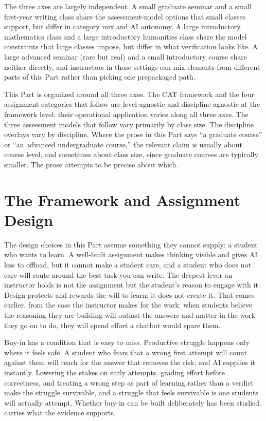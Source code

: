 \documentclass{SIAMbook2023}
\begin{document}
The three axes are largely independent. A small graduate seminar and a small first-year writing class share the assessment-model options that small classes support, but differ in category mix and AI autonomy. A large introductory mathematics class and a large introductory humanities class share the model constraints that large classes impose, but differ in what verification looks like. A large advanced seminar (rare but real) and a small introductory course share neither directly, and instructors in those settings can mix elements from different parts of this Part rather than picking one prepackaged path.

This Part is organized around all three axes. The CAT framework and the four assignment categories that follow are level-agnostic and discipline-agnostic at the framework level; their operational application varies along all three axes. The three assessment models that follow vary primarily by class size. The discipline overlays vary by discipline. Where the prose in this Part says ``a graduate course'' or ``an advanced undergraduate course,'' the relevant claim is usually about course level, and sometimes about class size, since graduate courses are typically smaller. The prose attempts to be precise about which.

\chapter{The Framework and Assignment Design}
\label{i:ch:the-framework-and-assignment-design}%

The design choices in this Part assume something they cannot supply: a student who wants to learn. A well-built assignment makes thinking visible and gives AI less to offload, but it cannot make a student care, and a student who does not care will route around the best task you can write. The deepest lever an instructor holds is not the assignment but the student's reason to engage with it. Design protects and rewards the will to learn; it does not create it. That comes earlier, from the case the instructor makes for the work: when students believe the reasoning they are building will outlast the answers and matter in the work they go on to do, they will spend effort a chatbot would spare them.

Buy-in has a condition that is easy to miss. Productive struggle happens only where it feels safe. A student who fears that a wrong first attempt will count against them will reach for the answer that removes the risk, and AI supplies it instantly. Lowering the stakes on early attempts, grading effort before correctness, and treating a wrong step as part of learning rather than a verdict make the struggle survivable, and a struggle that feels survivable is one students will actually attempt. Whether buy-in can be built deliberately has been studied.  carries what the evidence supports.
\end{document}
